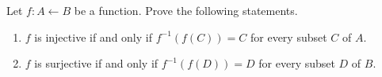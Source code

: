 \documentclass[12pt,letterpaper,boxed]{hmcpset}
\begin{document}
\begin{problem}[Exercise 3.4.]
Let $f: A \leftarrow B$ be a function. Prove the following statements.
\vspace{-2mm}
\begin{enumerate}
	\itemsep0em
	\item $f$ is injective if and only if $f^{-1}(f(C)) = C$ for every subset $C$ of $A$.
	\item $f$ is surjective if and only if $f^{-1}(f(D)) = D$ for every subset $D$ of $B$.
\end{enumerate}
\end{problem}
\end{document}
